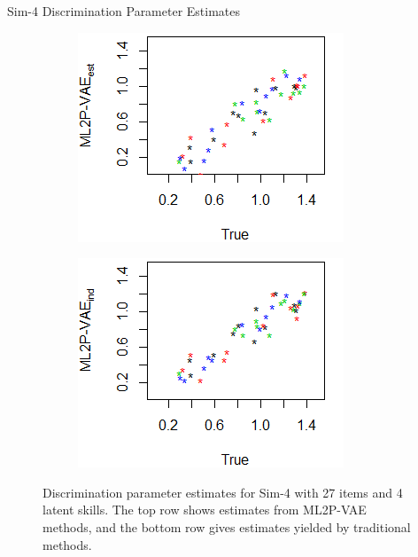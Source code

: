 \documentclass{beamer}
\theoremstyle{definition}
\begin{document}
\begin{frame}{Sim-4 Discrimination Parameter Estimates}
\begin{figure}[h]
\begin{subfigure}{.32\textwidth}
      \includegraphics[width=.9\linewidth]{../img/ml_journal_results/4skills/vae_est_disc_4skills_cropped.png}
    \end{subfigure}
    \begin{subfigure}{.32\textwidth}
      \centering
      \includegraphics[width=.9\linewidth]{../img/ml_journal_results/4skills/vae_ind_disc_4skills_cropped.png}
    \end{subfigure}
    \caption{Discrimination parameter estimates for Sim-4 with 27 items and 4 latent skills. The top row shows estimates from ML2P-VAE methods, and the bottom row gives estimates yielded by traditional methods.}
    \label{fig:4skills_disc}
\end{figure}


\end{frame}
\end{document}
